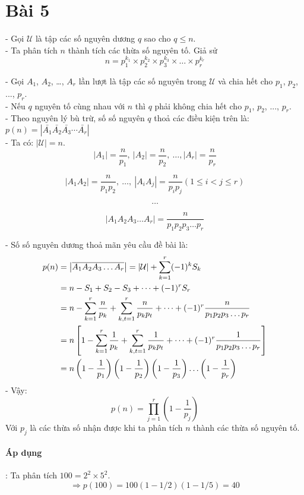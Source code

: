 \documentclass[main.tex]{subfiles}
\begin{document}
\section{Bài 5}
\newcommand{\U}{$\mathcal U$ }
\newcommand{\A}[1]{$A_{#1}$}
\newcommand{\abs}[1]{\left|#1\right|}

- Gọi \U là tập các số nguyên dương $q$ sao cho $q \le n$.\\
- Ta phân tích $n$ thành tích các thừa số nguyên tố. Giả sử
$$
n = p_1^{k_1} \times p_2^{k_2} \times p_3^{k_3} \times \dots \times p_r^{k_r} 
$$

- Gọi \A 1, \A 2, \dots, \A r lần lượt là tập các số nguyên trong \U  và chia hết cho $p_1$, $p_2$, ..., $p_r$.\\
- Nếu $q$ nguyên tố cùng nhau với $n$ thì $q$ phải không chia hết cho $p_1$, $p_2$, ..., $p_r$.\\
- Theo nguyên lý bù trừ, số số nguyên $q$ thoả các điều kiện trên là: $p(n) = \left|\bar{A_1}\bar{A_2}\bar{A_3}\cdots\bar{A_r}\right|$\\
- Ta có: $\abs{\mathcal U} = n$.\\
$$
\abs{A_1}=\frac{n}{p_1},\ \abs{A_2}=\frac{n}{p_2},\ \dots, \abs{A_r}=\frac{n}{p_r} 
$$

$$
\abs{A_1A_2}=\frac{n}{p_1p_2},\ \dots,\ \abs{A_iA_j}=\frac{n}{p_ip_j} (1 \le i < j \le r)
$$

$$
\dots
$$

$$
\abs{A_1A_2A_3 \dots A_r}=\frac{n}{p_1p_2p_3\dots p_r}
$$

- Số số nguyên dương thoả mãn yêu cầu đề bài là:
\begin{align*}
p(n) &= \abs{\overline{A_1A_2A_3 \dots A_r}}=\abs{\mathcal U} + \sum^{r}_{k=1}(-1)^kS_k \\ 
&= n - S_1 + S_2 - S_3 + \dots + (-1)^rS_r \\
&= n - \ssum{k=1}{r}{\frac{n}{p_k}} + \ssum{k,t=1}{r}{\frac{n}{p_kp_t}} + \dots + (-1)^r\frac{n}{p_1p_2p_3\dots p_r} \\
&= n \left[ 1 - \ssum{k=1}{r}{\frac{1}{p_k}} + \ssum{k,t=1}{r}{\frac{1}{p_kp_t}} + \dots + (-1)^r\frac{1}{p_1p_2p_3\dots p_r} \right]\\
&= n\left(1-\frac{1}{p_1}\right)\left(1-\frac{1}{p_2}\right)\left(1-\frac{1}{p_3}\right)\dots\left(1-\frac{1}{p_r}\right)
\end{align*}
- Vậy: 
$$
p(n) = \prod_{j=1}^{r}\left(1-\frac{1}{p_j}\right)
$$
Với $p_j$ là các thừa số nhận được khi ta phân tích $n$ thành các thừa số nguyên tố.

\paragraph*{Áp dụng}:
Ta phân tích $100=2^2\times 5^2$.
$$
\Rightarrow p(100)=100(1-1/2)(1-1/5)=40
$$
\end{document}
